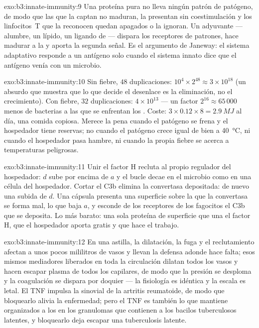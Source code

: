 \begin{solution}{exo:b3:innate-immunity:9}
Una proteína pura no lleva ningún patrón de patógeno, de modo que las
 que la captan no maduran, la presentan sin
coestimulación y los linfocitos~T que la reconocen quedan apagados o la
ignoran. Un adyuvante --- alumbre, un lípido, un ligando de  --- dispara los receptores de patrones, hace madurar a la
 y aporta la segunda señal. Es el argumento de Janeway:
el sistema adaptativo responde a un antígeno solo cuando el sistema
innato dice que el antígeno venía con un microbio.
\end{solution}

\begin{solution}{exo:b3:innate-immunity:10}
Sin fiebre, $48$ duplicaciones: $10^{4}\times 2^{48} \approx 3\times
10^{18}$ (un absurdo que muestra que lo que decide el desenlace es la
eliminación, no el crecimiento). Con fiebre, $32$ duplicaciones:
$4\times 10^{13}$ --- un factor $2^{16} \approx 65\,000$ menos de
bacterias a las que se enfrentan los . Coste:
$3\times 0.12\times 8 = \qty{2.9}{MJ}$ al día, una comida copiosa. Merece
la pena cuando el patógeno se frena y el hospedador tiene reservas; no
cuando el patógeno crece igual de bien a \qty{40}{\celsius}, ni cuando el
hospedador pasa hambre, ni cuando la propia fiebre se acerca a
temperaturas peligrosas.
\end{solution}

\begin{solution}{exo:b3:innate-immunity:11}
Unir el factor H recluta al propio regulador del hospedador: $d$ sube por
encima de $a$ y el bucle decae en el microbio como en una célula del
hospedador. Cortar el C3b elimina la convertasa depositada: de nuevo una
subida de $d$. Una cápsula presenta una superficie sobre la que la
convertasa se forma mal, lo que baja $a$, y esconde de los receptores de
los fagocitos el C3b que se deposita. Lo más barato: una sola proteína de
superficie que una el factor H, que el hospedador aporta gratis y que
hace el trabajo.
\end{solution}

\begin{solution}{exo:b3:innate-immunity:12}
En una astilla, la dilatación, la fuga y el reclutamiento afectan a unos
pocos mililitros de vasos y llevan la defensa adonde hace falta; esos
mismos mediadores liberados en toda la circulación dilatan todos los
vasos y hacen escapar plasma de todos los capilares, de modo que la
presión se desploma y la coagulación se dispara por doquier --- la
fisiología es idéntica y la escala es letal. El TNF impulsa la
 sinovial de la artritis reumatoide, de modo que bloquearlo
alivia la enfermedad; pero el TNF es también lo que mantiene organizados
a los  en los granulomas que contienen a los bacilos
tuberculosos latentes, y bloquearlo deja escapar una tuberculosis
latente.
\end{solution}

